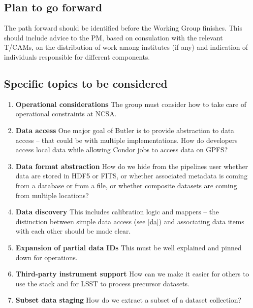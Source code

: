 \subsection{Plan to go forward}

The path forward should be identified before the Working Group finishes.
This should include advice to the PM, based on consulation with the relevant T/CAMs, on the distribution of work among institutes (if any) and indication of individuals responsible for different components.

\subsection{Specific topics to be considered}

\begin{enumerate}
\item \textbf{Operational considerations}
The group must consider how to take care of operational constraints at NCSA.

\item \textbf{Data access}\label{da}
One major goal of Butler is to provide abstraction to data access -- that could be with multiple implementations.
How do developers access local data while allowing Condor jobs to access data on GPFS?

\item \textbf{Data format abstraction}
How do we hide from the pipelines user whether data are stored in HDF5 or FITS, or whether associated metadata is coming from a database or from a file, or whether composite datasets are coming from multiple locations?

\item \textbf{Data discovery}
This includes calibration logic and mappers -- the distinction between simple data access (see \ref{da}) and associating data items with each other should be made clear.

\item \textbf{Expansion of partial data IDs}
This must be well explained and pinned down for operations.

\item \textbf{Third-party instrument support}
How can we make it easier for others to use the stack and for LSST to process precursor datasets.

\item \textbf{Subset data staging}
How do we extract a subset of a dataset collection?
\end{enumerate}

